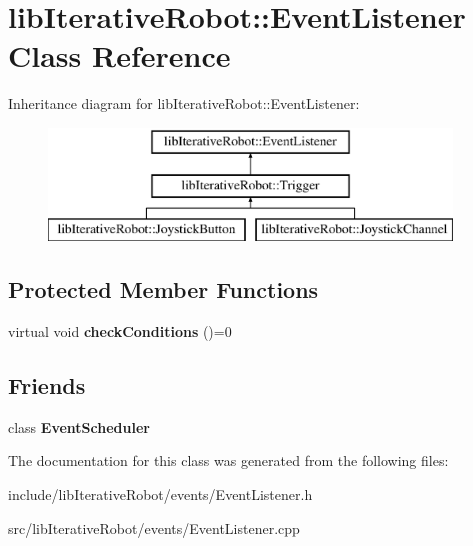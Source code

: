 \hypertarget{classlib_iterative_robot_1_1_event_listener}{}\section{lib\+Iterative\+Robot\+::Event\+Listener Class Reference}
\label{classlib_iterative_robot_1_1_event_listener}
Inheritance diagram for lib\+Iterative\+Robot\+::Event\+Listener\+:\begin{figure}[H]
\begin{center}
\leavevmode
\includegraphics[height=3.000000cm]{classlib_iterative_robot_1_1_event_listener}
\end{center}
\end{figure}
\subsection*{Protected Member Functions}
\begin{DoxyCompactItemize}
\item 
\mbox{\label{classlib_iterative_robot_1_1_event_listener_aacbdd1cd66bf22e081add72b127af3a1}} 
virtual void {\bfseries check\+Conditions} ()=0
\end{DoxyCompactItemize}
\subsection*{Friends}
\begin{DoxyCompactItemize}
\item 
\mbox{\label{classlib_iterative_robot_1_1_event_listener_a2a47195be57876de9e0c9e18467a34a3}} 
class {\bfseries Event\+Scheduler}
\end{DoxyCompactItemize}


The documentation for this class was generated from the following files\+:\begin{DoxyCompactItemize}
\item 
include/lib\+Iterative\+Robot/events/Event\+Listener.\+h\item 
src/lib\+Iterative\+Robot/events/Event\+Listener.\+cpp\end{DoxyCompactItemize}
